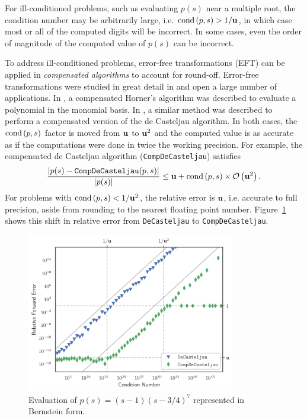 For ill-conditioned problems, such as evaluating \(p(s)\) near a
multiple root, the condition number may be arbitrarily large, i.e.
\(\operatorname{cond}\left(p, s\right) > 1 / \mathbf{u}\), in
which case most or all of the computed digits will be incorrect.
In some cases, even the order of magnitude of the computed value
of \(p(s)\) can be incorrect.

To address ill-conditioned problems, error-free transformations (EFT) can
be applied in \textit{compensated algorithms} to account for round-off.
Error-free transformations were studied in great detail in \cite{Ogita2005}
and open a large number of applications.
In \cite{langlois_et_al:DSP:2006:442}, a compensated Horner's algorithm was
described to evaluate a polynomial in the monomial basis. In \cite{Jiang2010},
a similar method was described to perform a compensated version of the de
Casteljau algorithm. In both cases, the \(\operatorname{cond}\left(p, s\right)\) factor is moved
from \(\mathbf{u}\) to \(\mathbf{u}^2\) and the computed value is as accurate
as if the computations were done in twice the working precision. For example,
the compensated de Casteljau algorithm (\texttt{CompDeCasteljau}) satisfies
\begin{equation}\label{eq:de-casteljau-2-error}
  \frac{\left|p(s) - \mathtt{CompDeCasteljau}(p, s)\right|}{
    \left|p(s)\right|} \leq \mathbf{u} + \operatorname{cond}\left(p, s\right) \times
    \mathcal{O}\left(\mathbf{u}^2\right).
\end{equation}
For problems with \(\operatorname{cond}\left(p, s\right) < 1 / \mathbf{u}^2\), the relative error
is \(\mathbf{u}\), i.e. accurate to full precision, aside from rounding to the
nearest floating point number. Figure~\ref{fig:jlcs-10} shows this shift
in relative error from \texttt{DeCasteljau} to \texttt{CompDeCasteljau}.

\begin{figure}
  \includegraphics[width=0.8125\textwidth]
                  {../images/k-compensated/jlcs10_plot.pdf}
  \centering
  \captionsetup{width=.75\linewidth}
  \caption{Evaluation of \(p(s) = (s - 1)\left(s - 3/4\right)^7\)
    represented in Bernstein form.}
  \label{fig:jlcs-10}
\end{figure}

